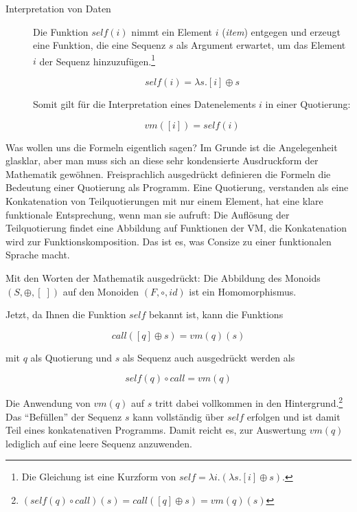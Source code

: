 \begin{description}
\item[Interpretation von Daten] Die Funktion $self(i)$ nimmt ein Element $i$ (\emph{item}) entgegen und erzeugt eine Funktion, die eine Sequenz $s$ als Argument erwartet, um das Element $i$ der Sequenz hinzuzufügen.\footnote{Die Gleichung ist eine Kurzform von $self = \lambda i.(\lambda s.[i]\oplus s)$.}

\begin{equation}
self(i) = \lambda s.[i]\oplus s
\end{equation}

Somit gilt für die Interpretation eines Datenelements $i$ in einer Quotierung:

\begin{equation}
vm([i]) = self(i)
\end{equation}

\end{description}

Was wollen uns die Formeln eigentlich sagen? Im Grunde ist die Angelegenheit glasklar, aber man muss sich an diese sehr kondensierte Ausdruckform der Mathematik gewöhnen. Freisprachlich ausgedrückt definieren die Formeln die Bedeutung einer Quotierung als Programm. Eine Quotierung, verstanden als eine Konkatenation von Teilquotierungen mit nur einem Element, hat eine klare funktionale Entsprechung, wenn man sie aufruft: Die Auflösung der Teilquotierung findet eine Abbildung auf Funktionen der VM, die Konkatenation wird zur Funktionskomposition. Das ist es, was Consize zu einer funktionalen Sprache macht.

Mit den Worten der Mathematik ausgedrückt: Die Abbildung des Monoids $(S,\oplus,[\;])$ auf den Monoiden $(F,\circ,id)$ ist ein Homomorphismus.

Jetzt, da Ihnen die Funktion $self$ bekannt ist, kann die Funktions

\begin{equation}
call([q]\oplus s) = vm(q)(s)
\end{equation}

mit $q$ als Quotierung und $s$ als Sequenz auch ausgedrückt werden als

\begin{equation}
self(q)\circ call = vm(q)
\end{equation}

Die Anwendung von $vm(q)$ auf $s$ tritt dabei vollkommen in den Hintergrund.\footnote{$(self(q)\circ call)(s)=call([q]\oplus s)=vm(q)(s)$} Das "`Befüllen"' der Sequenz $s$ kann vollständig über $self$ erfolgen und ist damit Teil eines konkatenativen Programms. Damit reicht es, zur Auswertung $vm(q)$ lediglich auf eine leere Sequenz anzuwenden.

